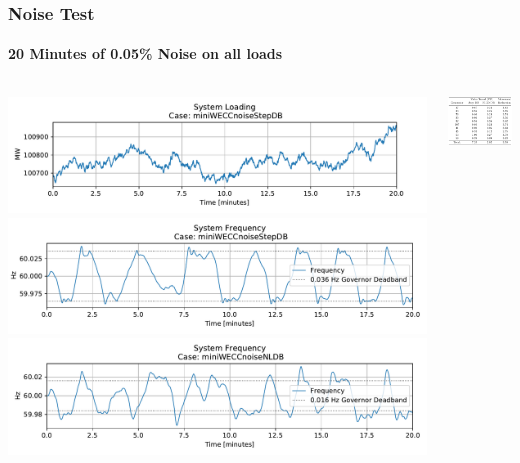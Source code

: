 \documentclass[14pt, unknownkeysallowed]{beamer}
\begin{document}
\begin{frame}
\frametitle{Noise Test}
\framesubtitle{20 Minutes of 0.05\% Noise on all loads}
\begin{columns}
\begin{column}{.5\linewidth}
\includegraphics[width=\linewidth]{miniWECCnoiseStepDBPload}
\includegraphics[width=\linewidth]{miniWECCnoiseStepDBFreq}
\includegraphics[width=\linewidth]{miniWECCnoiseNLDBFreq}
\end{column}
\begin{column}{.5\linewidth}
\includegraphics[width=\linewidth]{miniWECCnoiseRes01}
\end{column}
\end{columns}
\end{frame}
\end{document}
